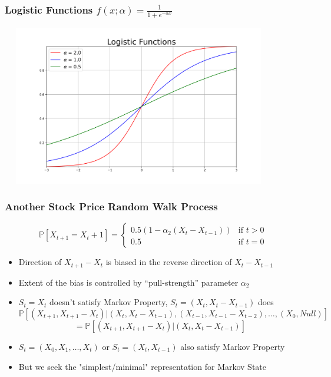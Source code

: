 \documentclass[handout]{beamer}
\begin{document}
\begin{frame}
\frametitle{Logistic Functions $f(x;\alpha) = \frac 1 {1 + e^{-\alpha x}}$}
\includegraphics[width=12cm, height=7cm]{logistic_curves.png}
\end{frame}

\begin{frame}
\frametitle{Another Stock Price Random Walk Process}
\pause
$$
\mathbb{P}[X_{t+1} = X_t + 1] =
\begin{cases}
0.5 (1 - \alpha_2(X_t - X_{t-1})) & \text{if } t > 0\\
0.5 & \text{if } t = 0
\end{cases}
$$
\begin{itemize}[<+->]
\item Direction of $X_{t+1} - X_t$ is biased in the reverse direction of $X_t - X_{t-1}$
\item Extent of the bias is controlled by ``pull-strength'' parameter $\alpha_2$
\item $S_t  = X_t$ doesn't satisfy Markov Property, $S_t = (X_t, X_t - X_{t-1})$ does
$$\mathbb{P}[(X_{t+1}, X_{t+1} - X_t)|(X_t, X_t - X_{t-1}), (X_{t-1}, X_{t-1} - X_{t-2}), \ldots, (X_0, Null)]$$
$$= \mathbb{P}[(X_{t+1}, X_{t+1} - X_t)|(X_t, X_t - X_{t-1})] $$
\item $S_t = (X_0, X_1, \ldots, X_t)$ or $S_t = (X_t, X_{t-1})$ also satisfy Markov Property
\item But we seek the  "simplest/minimal" representation for Markov State
\end{itemize}
\end{frame}
\end{document}
